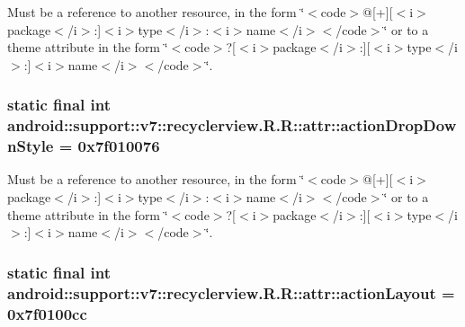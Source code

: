 Must be a reference to another resource, in the form \char`\"{}$<$code$>$@\mbox{[}+\mbox{]}\mbox{[}$<$i$>$package$<$/i$>$:\mbox{]}$<$i$>$type$<$/i$>$:$<$i$>$name$<$/i$>$$<$/code$>$\char`\"{} or to a theme attribute in the form \char`\"{}$<$code$>$?\mbox{[}$<$i$>$package$<$/i$>$:\mbox{]}\mbox{[}$<$i$>$type$<$/i$>$:\mbox{]}$<$i$>$name$<$/i$>$$<$/code$>$\char`\"{}. \hypertarget{classandroid_1_1support_1_1v7_1_1recyclerview_1_1_r_1_1attr_96244d832fcf1d824600f28d3782940f}{
\subsubsection[{actionDropDownStyle}]{\setlength{\rightskip}{0pt plus 5cm}static final int android::support::v7::recyclerview.R.R::attr::actionDropDownStyle = 0x7f010076}}
\label{classandroid_1_1support_1_1v7_1_1recyclerview_1_1_r_1_1attr_96244d832fcf1d824600f28d3782940f}


Must be a reference to another resource, in the form \char`\"{}$<$code$>$@\mbox{[}+\mbox{]}\mbox{[}$<$i$>$package$<$/i$>$:\mbox{]}$<$i$>$type$<$/i$>$:$<$i$>$name$<$/i$>$$<$/code$>$\char`\"{} or to a theme attribute in the form \char`\"{}$<$code$>$?\mbox{[}$<$i$>$package$<$/i$>$:\mbox{]}\mbox{[}$<$i$>$type$<$/i$>$:\mbox{]}$<$i$>$name$<$/i$>$$<$/code$>$\char`\"{}. \hypertarget{classandroid_1_1support_1_1v7_1_1recyclerview_1_1_r_1_1attr_ef35e8ee7669fc51af515c5edb9ce744}{
\subsubsection[{actionLayout}]{\setlength{\rightskip}{0pt plus 5cm}static final int android::support::v7::recyclerview.R.R::attr::actionLayout = 0x7f0100cc}}
\label{classandroid_1_1support_1_1v7_1_1recyclerview_1_1_r_1_1attr_ef35e8ee7669fc51af515c5edb9ce744}


